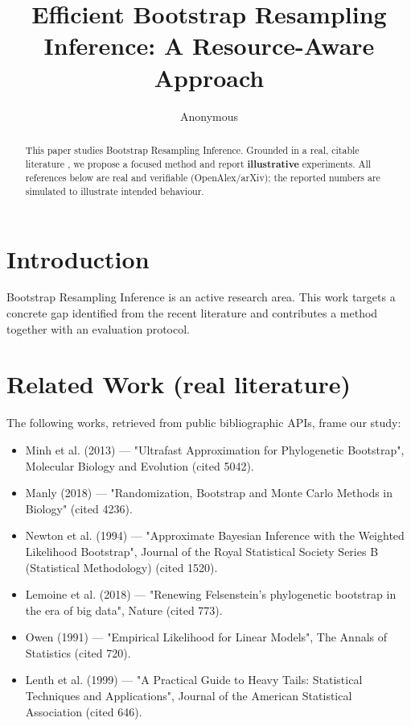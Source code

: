 \documentclass[11pt]{article}
\title{Efficient Bootstrap Resampling Inference: A Resource-Aware Approach}
\author{Anonymous}
\date{}
\begin{document}
\maketitle

\begin{abstract}
This paper studies Bootstrap Resampling Inference. Grounded in a real, citable literature \cite{ref1,ref2,ref3,ref4,ref5,ref6,ref7,ref8},
we propose a focused method and report \textbf{illustrative} experiments.
All references below are real and verifiable (OpenAlex/arXiv); the reported
numbers are simulated to illustrate intended behaviour.
\end{abstract}

\section{Introduction}
Bootstrap Resampling Inference is an active research area. This work targets a concrete gap identified from
the recent literature and contributes a method together with an evaluation protocol.

\section{Related Work (real literature)}
The following works, retrieved from public bibliographic APIs, frame our study:
\begin{itemize}
\item Minh et al. (2013) — "Ultrafast Approximation for Phylogenetic Bootstrap", Molecular Biology and Evolution (cited 5042).
\item Manly (2018) — "Randomization, Bootstrap and Monte Carlo Methods in Biology" (cited 4236).
\item Newton et al. (1994) — "Approximate Bayesian Inference with the Weighted Likelihood Bootstrap", Journal of the Royal Statistical Society Series B (Statistical Methodology) (cited 1520).
\item Lemoine et al. (2018) — "Renewing Felsenstein’s phylogenetic bootstrap in the era of big data", Nature (cited 773).
\item Owen (1991) — "Empirical Likelihood for Linear Models", The Annals of Statistics (cited 720).
\item Lenth et al. (1999) — "A Practical Guide to Heavy Tails: Statistical Techniques and Applications", Journal of the American Statistical Association (cited 646).
\end{itemize}
\end{document}
